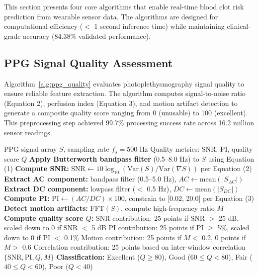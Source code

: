 \documentclass[3p,times,procedia]{elsarticle}
\begin{document}
This section presents four core algorithms that enable real-time blood clot risk prediction from wearable sensor data. The algorithms are designed for computational efficiency ($<$ 1 second inference time) while maintaining clinical-grade accuracy (84.38\% validated performance).

\subsection{PPG Signal Quality Assessment}
\vspace{-2pt}

Algorithm~\ref{alg:ppg_quality} evaluates photoplethysmography signal quality to ensure reliable feature extraction. The algorithm computes signal-to-noise ratio (Equation 2), perfusion index (Equation 3), and motion artifact detection to generate a composite quality score ranging from 0 (unusable) to 100 (excellent). This preprocessing step achieved 99.7\% processing success rate across 16.2 million sensor readings.

\begin{algorithm}[H]\footnotesize\setlength{\abovecaptionskip}{-2pt}
\caption{PPG Signal Quality Assessment}
\label{alg:ppg_quality}
\begin{algorithmic}[1]
    \Require PPG signal array $S$, sampling rate $f_s = 500$ Hz
    \Ensure Quality metrics: SNR, PI, quality score $Q$
    \State \textbf{Apply Butterworth bandpass filter} (0.5–8.0 Hz) to $S$ using Equation (1)
    \State \textbf{Compute SNR:} $\text{SNR} \gets 10 \log_{10}(\text{Var}(S) / \text{Var}(\nabla S))$ per Equation (2)
    \State \textbf{Extract AC component:} bandpass filter (0.5–5.0 Hz), $AC \gets \text{mean}(|S_{AC}|)$
    \State \textbf{Extract DC component:} lowpass filter ($<$ 0.5 Hz), $DC \gets \text{mean}(|S_{DC}|)$
    \State \textbf{Compute PI:} $\text{PI} \gets (AC / DC) \times 100$, constrain to [0.02, 20.0] per Equation (3)
    \State \textbf{Detect motion artifacts:} $\text{FFT}(S)$, compute high-frequency ratio $M$
    \State \textbf{Compute quality score $Q$:}
    \State \quad SNR contribution: 25 points if SNR $>$ 25 dB, scaled down to 0 if SNR $<$ 5 dB
    \State \quad PI contribution: 25 points if PI $\geq$ 5\%, scaled down to 0 if PI $<$ 0.1\%
    \State \quad Motion contribution: 25 points if $M <$ 0.2, 0 points if $M >$ 0.6
    \State \quad Correlation contribution: 25 points based on inter-window correlation
    \State \Return $\{\text{SNR}, \text{PI}, Q, M\}$
    \State \textbf{Classification:} Excellent ($Q \geq 80$), Good ($60 \leq Q < 80$), Fair ($40 \leq Q < 60$), Poor ($Q < 40$)
\end{algorithmic}
\end{algorithm}
\end{document}
